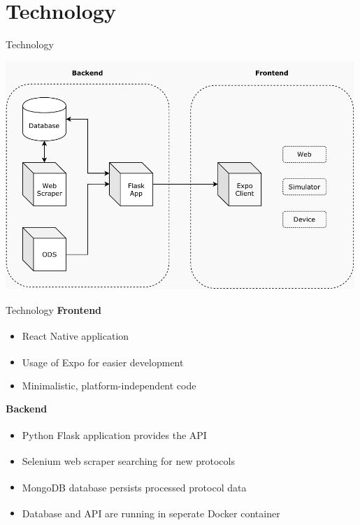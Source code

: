 \documentclass{beamer}
\newcounter{index}
\begin{document}
  \section{Technology}
  \begin{frame}[plain]{Technology}
    \begin{center}
      \includegraphics[width=0.99\textwidth]{fig/technology_overview.pdf}
    \end{center}
  \end{frame}

  \begin{frame}[plain]{Technology}
    \textbf{\faDesktop}\quad\textbf{Frontend}
    \begin{itemize}
      \item React Native\textsuperscript{\hyperlink{link-react-native}{}} application
      \item Usage of Expo\textsuperscript{\hyperlink{link-expo}{}} for easier development
      \item Minimalistic, platform-independent code
    \end{itemize}
    \textbf{\faServer}\quad\textbf{Backend}
    \begin{itemize}
      \item Python Flask\textsuperscript{\hyperlink{link-flask}{}} application provides the API
      \item Selenium\textsuperscript{\hyperlink{link-selenium}{}} web scraper searching for new protocols
      \item MongoDB\textsuperscript{\hyperlink{link-mongodb}{}} database persists processed protocol data
      \item Database and API are running in seperate Docker\textsuperscript{\hyperlink{link-docker}{}} container
    \end{itemize}
  \end{frame}
\end{document}

